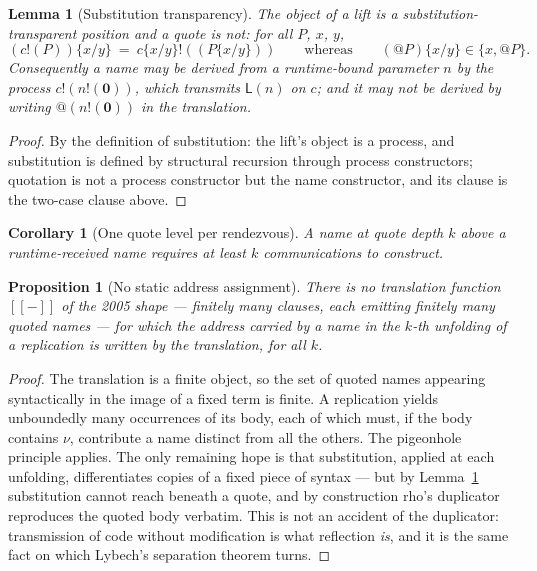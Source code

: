 \documentclass[11pt]{article}
\makeatletter
\theoremstyle{definition}
\theoremstyle{plain}
\newtheorem{proposition}[definition]{Proposition}
\newtheorem{lemma}[definition]{Lemma}
\newtheorem{corollary}[definition]{Corollary}
\theoremstyle{remark}
\newcommand{\quo}[1]{@#1}
\newcommand{\out}[2]{#1!(#2)}
\newcommand{\enc}[1]{[\![#1]\!]}
\newcommand{\nil}{\mathbf{0}}
\newcommand{\Lft}{\mathsf{L}}
\makeatother
\begin{document}
\begin{lemma}[Substitution transparency]\label{lem:transparency}
The object of a lift is a substitution-transparent position and a quote is
not: for all $P$, $x$, $y$,
\[
  (\out{c}{P})\{x/y\} \ =\ \out{c\{x/y\}}{(P\{x/y\})}
  \qquad\text{whereas}\qquad
  (\quo{P})\{x/y\} \in \{x, \quo{P}\}.
\]
Consequently a name may be derived from a runtime-bound parameter $n$ by
the process $\out{c}{\out{n}{\nil}}$, which transmits $\Lft(n)$ on $c$;
and it may not be derived by writing $\quo{(\out{n}{\nil})}$ in the
translation.
\end{lemma}

\begin{proof}
By the definition of substitution: the lift's object is a process, and
substitution is defined by structural recursion through process
constructors; quotation is not a process constructor but the name
constructor, and its clause is the two-case clause above.
\end{proof}

\begin{corollary}[One quote level per rendezvous]\label{cor:onequote}
A name at quote depth $k$ above a runtime-received name requires at least
$k$ communications to construct.
\end{corollary}

\begin{proposition}[No static address assignment]\label{prop:nogo}
There is no translation function $\enc{-}$ of the 2005 shape --- finitely
many clauses, each emitting finitely many quoted names --- for which the
address carried by a name in the $k$-th unfolding of a replication is
written by the translation, for all $k$.
\end{proposition}

\begin{proof}
The translation is a finite object, so the set of quoted names appearing
syntactically in the image of a fixed term is finite. A replication
yields unboundedly many occurrences of its body, each of which must, if
the body contains $\nu$, contribute a name distinct from all the others.
The pigeonhole principle applies. The only remaining hope is that
substitution, applied at each unfolding, differentiates copies of a fixed
piece of syntax --- but by Lemma~\ref{lem:transparency} substitution
cannot reach beneath a quote, and by construction rho's duplicator
reproduces the quoted body verbatim. This is not an accident of the
duplicator: transmission of code without modification is what reflection
\emph{is}, and it is the same fact on which Lybech's separation theorem
turns.
\end{proof}
\end{document}
